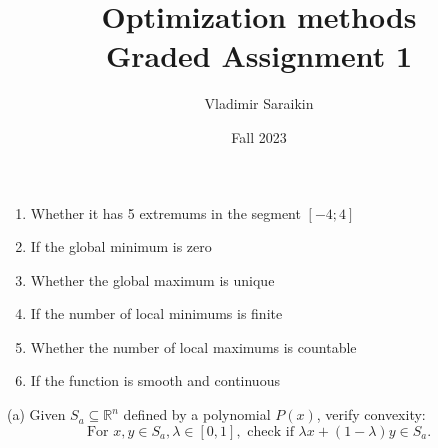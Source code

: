 \documentclass{exam}
\title{Optimization methods  \\ 
Graded Assignment 1}
\author{Vladimir Saraikin}
\date{Fall 2023}
\begin{document}
\maketitle


\begin{questions}


\begin{enumerate}
    \item Whether it has 5 extremums in the segment \([-4; 4]\)

    \item If the global minimum is zero

    \item Whether the global maximum is unique

    \item If the number of local minimums is finite

    \item Whether the number of local maximums is countable

    \item If the function is smooth and continuous
\end{enumerate}


(a) Given \( S_a \subseteq \mathbb{R}^n \) defined by a polynomial \( P(x) \), verify convexity:
\[ \text{For } x, y \in S_a, \lambda \in [0,1], \text{ check if } \lambda x + (1 - \lambda)y \in S_a. \]


\end{questions}
\end{document}
